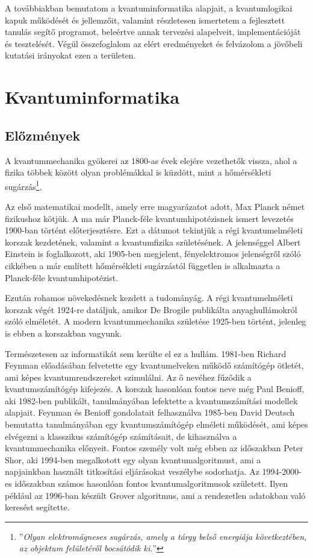 \documentclass[
]{thesis-ekf}
\theoremstyle{definition}
\theoremstyle{remark}
\begin{document}
A továbbiakban bemutatom a kvantuminformatika alapjait, a kvantumlogikai kapuk működését és jellemzőit, valamint részletesen ismertetem a fejlesztett tanulás segítő programot, beleértve annak tervezési alapelveit, implementációját és tesztelését. Végül összefoglalom az elért eredményeket és felvázolom a jövőbeli kutatási irányokat ezen a területen.

\chapter{Kvantuminformatika}
\section{Előzmények}
A kvantummechanika gyökerei az 1800-as évek elejére vezethetők vissza, ahol a fizika többek között olyan problémákkal is küzdött, mint a hőmérsékleti sugárzás\footnote{''\emph{Olyan elektromágneses sugárzás, amely a tárgy belső energiája következtében, az objektum felületéről bocsátódik ki.}''\cite{WikipediaQHistory}}.

Az első matematikai modellt, amely erre magyarázatot adott, Max Planck német fizikushoz kötjük. A ma már Planck-féle kvantumhipotézisnek ismert levezetés 1900-ban történt előterjesztésre. Ezt a dátumot tekintjük a régi kvantumelméleti korszak kezdetének, valamint a kvantumfizika születésének. A jelenséggel Albert Einstein is foglalkozott, aki 1905-ben megjelent, fényelektromos jelenségről szóló cikkében a már említett hőmérsékleti sugárzástól független is alkalmazta a Planck-féle kvantumhipotézist.\cite{WikipediaQHistory}

Ezután rohamos növekedésnek kezdett a tudományág. A régi kvantumelméleti korszak végét 1924-re datáljuk, amikor De Brogile publikálta anyaghullámokról szóló elméletét. A modern kvantummechanika születése 1925-ben történt, jelenleg is ebben a korszakban vagyunk.

Természetesen az informatikát sem kerülte el ez a hullám. 1981-ben Richard Feynman előadásában felvetette egy kvantumelveken működő számítógép ötletét, ami képes kvantumrendszereket szimulálni. Az ő nevéhez fűződik a kvantumszámítógép kifejezés. A korszak hasonlóan fontos neve még Paul Benioff, aki 1982-ben publikált, tanulmányában lefektette a kvantumszámítási modellek alapjait. Feynman és Benioff gondolatait felhasználva 1985-ben David Deutsch bemutatta tanulmányában egy kvantumszámítógép elméleti működését, ami képes elvégezni a klasszikus számítógép számításait, de kihasználva a kvantummechanika előnyeit. Fontos személy volt még ebben az időszakban Peter Shor, aki 1994-ben megalkotott egy olyan kvantumalgoritmust, ami a napjainkban használt titkosítási eljárásokat veszélybe sodorhatja. Az 1994-2000-es időszakban számos hasonlóan fontos kvantumalgoritmusok született. Ilyen például az 1996-ban készült Grover algoritmus, ami a rendezetlen adatokban való keresést segítette.\cite{WikipediaQHistory,BiróKoczkaPrantner}
\end{document}
